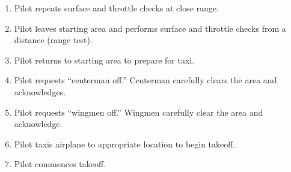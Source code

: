 \documentclass[10pt,twocolumns]{report}
\begin{document}
\begin{enumerate}
	\item Pilot repeats surface and throttle checks at close range.
	\item Pilot leaves starting area and performs surface and throttle checks from a distance (range test).
	\item Pilot returns to starting area to prepare for taxi.
	\item Pilot requests ``centerman off.''  Centerman carefully clears the area and acknowledges.
	\item Pilot requests ``wingmen off.''  Wingmen carefully clear the area and acknowledge.
	\item Pilot taxis airplane to appropriate location to begin takeoff.
	\item Pilot commences takeoff.

\end{enumerate}




\end{document}
